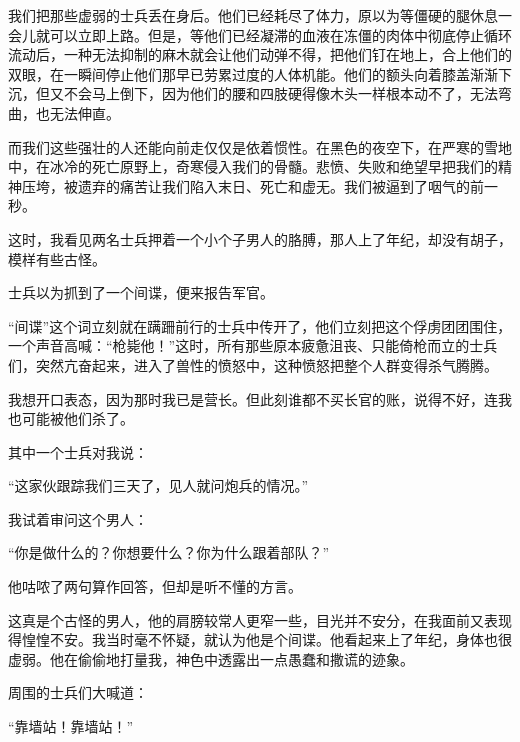 \documentclass{article}
\begin{document}
我们把那些虚弱的士兵丢在身后。他们已经耗尽了体力，原以为等僵硬的腿休息一会儿就可以立即上路。但是，等他们已经凝滞的血液在冻僵的肉体中彻底停止循环流动后，一种无法抑制的麻木就会让他们动弹不得，把他们钉在地上，合上他们的双眼，在一瞬间停止他们那早已劳累过度的人体机能。他们的额头向着膝盖渐渐下沉，但又不会马上倒下，因为他们的腰和四肢硬得像木头一样根本动不了，无法弯曲，也无法伸直。



而我们这些强壮的人还能向前走仅仅是依着惯性。在黑色的夜空下，在严寒的雪地中，在冰冷的死亡原野上，奇寒侵入我们的骨髓。悲愤、失败和绝望早把我们的精神压垮，被遗弃的痛苦让我们陷入末日、死亡和虚无。我们被逼到了咽气的前一秒。



这时，我看见两名士兵押着一个小个子男人的胳膊，那人上了年纪，却没有胡子，模样有些古怪。



士兵以为抓到了一个间谍，便来报告军官。



“间谍”这个词立刻就在蹒跚前行的士兵中传开了，他们立刻把这个俘虏团团围住，一个声音高喊：“枪毙他！”这时，所有那些原本疲惫沮丧、只能倚枪而立的士兵们，突然亢奋起来，进入了兽性的愤怒中，这种愤怒把整个人群变得杀气腾腾。



我想开口表态，因为那时我已是营长。但此刻谁都不买长官的账，说得不好，连我也可能被他们杀了。



其中一个士兵对我说：



“这家伙跟踪我们三天了，见人就问炮兵的情况。”



我试着审问这个男人：



“你是做什么的？你想要什么？你为什么跟着部队？”



他咕哝了两句算作回答，但却是听不懂的方言。



这真是个古怪的男人，他的肩膀较常人更窄一些，目光并不安分，在我面前又表现得惶惶不安。我当时毫不怀疑，就认为他是个间谍。他看起来上了年纪，身体也很虚弱。他在偷偷地打量我，神色中透露出一点愚蠢和撒谎的迹象。



周围的士兵们大喊道：



“靠墙站！靠墙站！”
\end{document}
